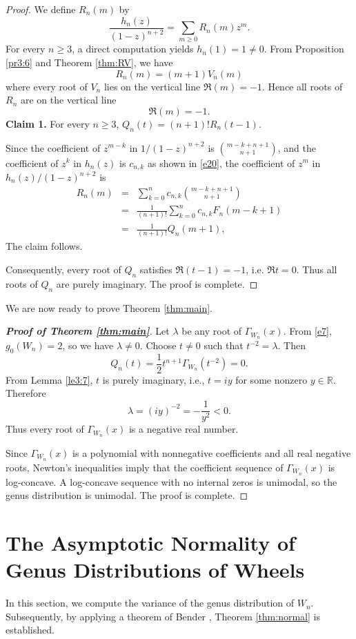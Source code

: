 \documentclass[12pt]{article}
\theoremstyle{definition}
\begin{document}
\begin{proof}
We define $R_n(m)$ by
\[
\frac{h_n(z)}{(1-z)^{n+2}}=\sum_{m\ge 0}R_n(m)z^m.
\]
For every $n\geq 3$, a direct computation yields $h_n(1)=1\ne 0$. From Proposition
\ref{pr3:6} and Theorem \ref{thm:RV}, we have
$$R_n(m)=(m+1)V_{n}(m)$$
where every root of \(V_n\) lies on the vertical line
\(\Re  (m)=-1.\) Hence all roots of $R_n$ are on the vertical line
\[
\Re  (m)=-1.
\]
\textbf{Claim 1.} For every $n\geq 3$, $Q_n(t)=(n+1)!R_n(t-1)$.

Since the coefficient of $z^{m-k}$ in $1/(1-z)^{n+2}$ is $\binom{m-k+n+1}{n+1}$, and the coefficient of $z^k$ in $h_n(z)$ is $c_{n,k}$ as shown in \eqref{e20}, the coefficient of $z^m$ in
$h_n(z)/(1-z)^{n+2}$ is
\begin{eqnarray*}
R_n(m) & = & \sum_{k=0}^n c_{n,k} \binom{m-k+n+1}{n+1} \\
& = & \frac{1}{(n+1)!} \sum_{k=0}^n c_{n,k} F_n(m-k+1) \\
& = & \frac{1}{(n+1)!} Q_n(m+1),
\end{eqnarray*}
The claim follows.

Consequently, every root of \(Q_n\) satisfies \(\Re(t-1)=-1\), i.e. \(\Re t=0\). Thus all roots of \(Q_n\) are purely imaginary. The proof is complete.
\end{proof}

We are now ready to prove Theorem \ref{thm:main}.

\begin{proof}[\bf{Proof of Theorem \ref{thm:main}}]
Let \(\lambda\) be any root of \(\Gamma_{W_n}(x)\).
From \eqref{e7}, \(g_0(W_n)=2\), so we have \(\lambda\ne0\).
Choose \(t\ne0\) such that \(t^{-2}=\lambda\). Then
\[
Q_n(t)=\frac12 t^{n+1}\Gamma_{W_n}(t^{-2})=0.
\]
From Lemma \ref{le3:7}, \(t\) is purely imaginary, i.e., \(t=iy\) for some nonzero
\(y\in\mathbb{R}\). Therefore
\[
\lambda=(iy)^{-2}=-\frac1{y^2}<0.
\]
Thus every root of \(\Gamma_{W_n}(x)\) is a negative real number.

 Since \(\Gamma_{W_n}(x)\) is a polynomial with nonnegative coefficients and all real negative roots, Newton's inequalities imply that the coefficient sequence of \(\Gamma_{W_n}(x)\)  is log-concave. A log-concave sequence with no internal zeros is unimodal, so the genus distribution is unimodal. The proof is complete.
\end{proof}


\section{The Asymptotic Normality of Genus Distributions of Wheels}\label{Sec:4}
In this section, we compute the variance of the genus distribution of  \(W_n\). Subsequently, by applying a theorem of
Bender \cite{Ben73}, Theorem \ref{thm:normal} is established.
\end{document}
